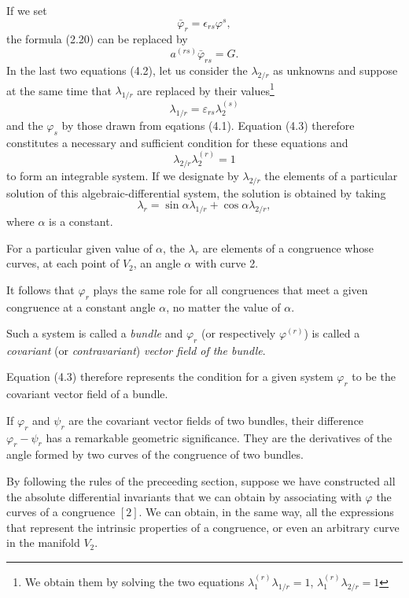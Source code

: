 \documentclass{book}
\begin{document}
If we set
$$\bar{\varphi}_r=\epsilon_{rs}\varphi^{s},$$
the formula (2.20) can be replaced by
\begin{equation}
a^{(rs)}\bar{\varphi}_{rs}=G.
\end{equation}
In the last two equations (4.2), let us consider the $\lambda_{2/r}$ as unknowns and suppose at the same time that $\lambda_{1/r}$ are replaced by their values\footnote{We obtain them by solving the two equations $\lambda_1^{(r)}\lambda_{1/r}=1$, $\lambda_1^{(r)}\lambda_{2/r}=1$}
$$\lambda_{1/r}=\varepsilon_{rs}\lambda_2^{(s)}$$
and the $\varphi_s$ by those drawn from eqations (4.1). Equation (4.3) therefore constitutes a necessary and sufficient condition for these equations and
\begin{equation}
\lambda_{2/r}\lambda_2^{(r)}=1
\end{equation}
to form an integrable system. If we designate by $\lambda_{2/r}$ the elements of a particular solution of this algebraic-differential system, the solution is obtained by taking
$$\lambda_r=\sin\alpha\lambda_{1/r}+\cos\alpha\lambda_{2/r},$$
where $\alpha$ is a constant. 

For a particular given value of $\alpha$, the $\lambda_r$ are elements of a congruence whose curves, at each point of $V_2$, an angle $\alpha$ with curve 2.

It follows that $\varphi_r$ plays the same role for all congruences that meet a given congruence at a constant angle $\alpha$, no matter the value of $\alpha$.

Such a system is called a \emph{bundle} and $\varphi_r$ (or respectively $\varphi^{(r)}$) is called a \emph{covariant } (or \emph{contravariant}) \emph{vector field of the bundle}.

Equation (4.3) therefore represents the condition for a given system $\varphi_r$ to be the covariant vector field of a bundle.

If $\varphi_r$ and $\psi_r$ are the covariant vector fields of two bundles, their difference $\varphi_r-\psi_r$ has a remarkable geometric significance. They are the derivatives of the angle formed by two curves of the congruence of two bundles. 

By following the rules of the preceeding section, suppose we have constructed all the absolute differential invariants that we can obtain by associating with $\varphi$ the curves of a congruence $[2]$. We can obtain, in the same way, all the expressions that represent the intrinsic properties of a congruence, or even an arbitrary curve in the manifold $V_2$. 
\end{document}
